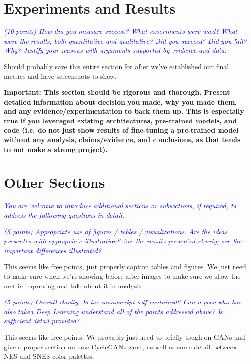 \documentclass[10pt,twocolumn,letterpaper]{article}
\begin{document}
\section{Experiments and Results}

\textit{\textcolor{blue}{(10 points) How did you measure success? What experiments were used? What were the results, both quantitative and qualitative? Did you succeed? Did you fail? Why? Justify your reasons with arguments supported by evidence and data.}}

Should probably save this entire section for after we've established our final metrics and have screenshots to show.

\textbf{Important: This section should be rigorous and thorough. Present detailed information about decision you made, why you made them, and any evidence/experimentation to back them up. This is especially true if you leveraged existing architectures, pre-trained models, and code (i.e. do not just show results of fine-tuning a pre-trained model without any analysis, claims/evidence, and conclusions, as that tends to not make a strong project). }

\section{Other Sections}

\textit{\textcolor{blue}{You are welcome to introduce additional sections or subsections, if required, to address the following questions in detail.}}

\textit{\textcolor{blue}{(5 points) Appropriate use of figures / tables / visualizations. Are the ideas presented with appropriate illustration? Are the results presented clearly; are the important differences illustrated?}} 

This seems like free points, just properly caption tables and figures. We just need to make sure when we're showing before-after images to make sure we show the metric improving and talk about it in analysis.

\textit{\textcolor{blue}{(5 points) Overall clarity. Is the manuscript self-contained? Can a peer who has also taken Deep Learning understand all of the points addressed above? Is sufficient detail provided?}} 

This seems like free points. We probably just need to briefly tough on GANs and give a proper section on how CycleGANs work, as well as some detail between NES and SNES color palettes.
\end{document}
